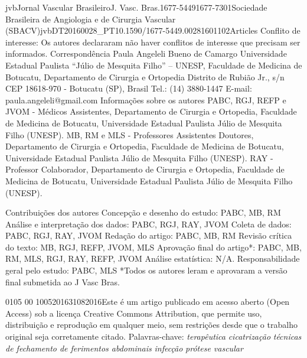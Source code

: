 \documentclass[numberinsection,times,10pt,spreadimages]{memoir}
\begin{document}
jvbJornal Vascular BrasileiroJ. Vasc. Bras.1677-54491677-7301Sociedade
Brasileira de Angiologia e de Cirurgia Vascular
(SBACV)jvbDT20160028\_{}PT10.1590/1677-5449.00281601102Articles
Conflito de interesse: Os autores declararam não haver conflitos de interesse
que precisam ser informados.
\label{*}
Correspondência Paula Angeleli Bueno de Camargo Universidade
Estadual Paulista “Júlio de Mesquita Filho” – UNESP, Faculdade de Medicina de
Botucatu, Departamento de Cirurgia e Ortopedia Distrito de Rubião Jr., s/n CEP
18618-970 - Botucatu (SP), Brasil Tel.: (14) 3880-1447 E-mail:
paula.angeleli@gmail.com
Informações sobre os autores PABC, RGJ, REFP e JVOM - Médicos Assistentes,
Departamento de Cirurgia e Ortopedia, Faculdade de Medicina de Botucatu,
Universidade Estadual Paulista Júlio de Mesquita Filho (UNESP). MB, RM e MLS
- Professores Assistentes Doutores, Departamento de Cirurgia e Ortopedia,
Faculdade de Medicina de Botucatu, Universidade Estadual Paulista Júlio de
Mesquita Filho (UNESP). RAY - Professor Colaborador, Departamento de
Cirurgia e Ortopedia, Faculdade de Medicina de Botucatu, Universidade
Estadual Paulista Júlio de Mesquita Filho (UNESP).

Contribuições dos autores Concepção e desenho do estudo: PABC, MB, RM Análise
e interpretação dos dados: PABC, RGJ, RAY, JVOM Coleta de dados: PABC, RGJ,
RAY, JVOM Redação do artigo: PABC, MB, RM Revisão crítica do texto: MB, RGJ,
REFP, JVOM, MLS Aprovação final do artigo*: PABC, MB, RM, MLS, RGJ, RAY,
REFP, JVOM Análise estatística: N/A. Responsabilidade geral pelo estudo:
PABC, MLS *Todos os autores leram e aprovaram a versão final submetida ao J
Vasc Bras.
\date{2017}{01}{05}
\newcommand{\volume}{00}
00\newcommand{\fpage}{000}
\newcommand{\lpage}{000}
1005201631082016Este é um artigo publicado em acesso aberto (Open
Access) sob a licença Creative Commons
Attribution, que permite uso, distribuição e reprodução em
qualquer meio, sem restrições desde que o trabalho original seja
corretamente citado.
Palavras-chave: \textit{terapêutica}
\textit{cicatrização}
\textit{técnicas de fechamento de ferimentos abdominais}
\textit{infecção}
\textit{prótese vascular}
\end{document}
